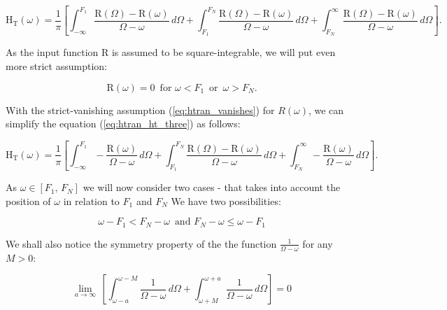 \documentclass[12pt,twoside,a4paper]{article}
\numberwithin{equation}{subsection}
\numberwithin{figure}{subsection}
\begin{document}
\begin{equation} \label{eq:htran_ht_three}
  \mathrm{H_T}(\omega ) = \frac{1}{\pi } \left[ 
    \int_{ -\infty }^{F_1} \frac {\mathrm{R}(\Omega ) - \mathrm{R}(\omega )}{\Omega  - \omega }\,d\Omega 
  + \int_{ F_1 }^{ F_N }   \frac {\mathrm{R}(\Omega ) - \mathrm{R}(\omega )}{\Omega  - \omega }\,d\Omega 
  + \int_{ F_N }^{ \infty} \frac {\mathrm{R}(\Omega ) - \mathrm{R}(\omega )}{\Omega  - \omega }\,d\Omega 
  \right] .
\end{equation}

As the input function R is assumed to be square-integrable, we will put even more strict assumption:

\begin{equation} \label{eq:htran_vanishes}
  \mathrm{R}(\omega) = 0 \, \text{ for } \omega < F_1 \, \text { or } \, \omega > F_N.  
\end{equation}

With the strict-vanishing assumption (\ref{eq:htran_vanishes}) for $R(\omega)$, we can simplify the equation (\ref{eq:htran_ht_three}) as follows:

\begin{equation} \label{eq:htran_ht}
  \mathrm{H_T}(\omega ) = \frac{1}{\pi } \left[ 
    \int_{ -\infty }^{F_1} - \frac {\mathrm{R}(\omega )}{\Omega - \omega }\,d\Omega
  + \int_{ F_1 }^{ F_N }     \frac {\mathrm{R}(\Omega ) - \mathrm{R}(\omega )}{\Omega - \omega }\,d\Omega 
  + \int_{ F_N }^{ \infty} - \frac {\mathrm{R}(\omega )}{\Omega - \omega }\,d\Omega 
  \right] .
\end{equation}

As $\omega  \in [F_1, \,F_N]$  we will now consider two cases - that takes into account the position of  $\omega $ in relation to $F_1$  and $F_N$ We have two possibilities:

\begin{equation}   \label{eq:htran_twoposibilities}
	\omega - F_1 < F_N - \omega \, \text{ and } F_N - \omega \leq \omega - F_1 
\end{equation}

We shall also notice the symmetry property of the the function $\frac {1}{\Omega - \omega }$ for any $M > 0$:

\begin{equation} \label{eq:htran_forallm}
    \lim_{a \to \infty} \, \left[	
    \int_{ \omega - a}^{\omega - M}\frac {1}{\Omega - \omega}\,d\Omega 
  + \int_{\omega + M}^{ \omega + a }\frac {1}{\Omega - \omega}\,d\Omega \right] = 0 
\end{equation}
\end{document}
